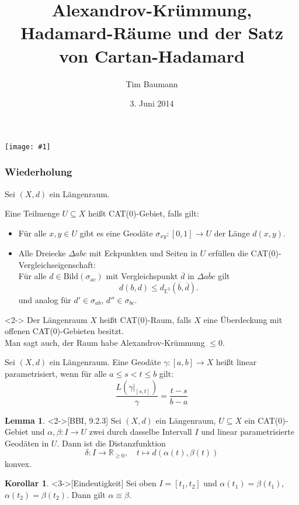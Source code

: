 \documentclass{beamer}
\title{Alexandrov-Krümmung, Hadamard-Räume und der Satz von Cartan-Hadamard}
\author{Tim Baumann}
\institute{Seminar Metrische Geometrie}
\date{3. Juni 2014}
\newcommand{\E}{\mathbb{E}} %
\newcommand{\R}{\mathbb{R}} %
\newcommand{\I}{\left[0,1\right]} %
\newcommand{\Bild}{\mathrm{Bild}} %
\renewcommand{\emph}[1]{\textcolor{Emph}{#1}}
\theoremstyle{definition}
\newtheorem*{lem}{Lemma}
\newtheorem*{kor}{Korollar}
\newcommand{\framedgraphic}[1] {
  \begin{frame}
    \begin{center}
      \vspace{-10pt}
      \texttt{[image: \#1]}
    \end{center}
  \end{frame}
}
\begin{document}
\setlength{\abovedisplayskip}{2pt}
\setlength{\belowdisplayskip}{2pt}
\setlength{\abovedisplayshortskip}{2pt}
\setlength{\belowdisplayshortskip}{2pt}

\begin{frame}[plain]
  \titlepage
\end{frame}

\framedgraphic{bilder/Picture15.jpg}

\begin{frame}
  \frametitle{Wiederholung}

  Sei $(X, d)$ ein Längenraum.

  \begin{definition}
    Eine Teilmenge $U \subseteq X$ heißt \emph{CAT($0$)-Gebiet}, falls gilt:
    \begin{itemize}
      \item Für alle $x, y \in U$ gibt es eine Geodäte $\sigma_{xy} : \I \to U$ der Länge $d(x, y)$.
      \item Alle Dreiecke $\Delta abc$ mit Eckpunkten und Seiten in $U$ erfüllen die CAT($0$)-Vergleichseigenschaft:\\
      Für alle $d \in \Bild(\sigma_{ac})$ mit Vergleichspunkt $\overline{d}$ in $\Delta \overline{abc}$ gilt
      \[ d(b, d) \leq d_{\E^2}(\overline{b}, \overline{d}). \]
      und analog für $d' \in \sigma_{ab}$, $d'' \in \sigma_{bc}$.
    \end{itemize}
  \end{definition}

  \begin{definition}<2->
    Der Längenraum $X$ heißt \emph{CAT($0$)-Raum}, falls $X$ eine Überdeckung mit offenen CAT($0$)-Gebieten besitzt.\\
    Man sagt auch, der Raum habe \emph{Alexandrov-Krümmung $\leq 0$}.
  \end{definition}
\end{frame}

\begin{frame}
  \begin{definition}
    Sei $(X, d)$ ein Längenraum. Eine Geodäte $\gamma : \left[a, b\right] \to X$ heißt \emph{linear parametrisiert}, wenn für alle $a \leq s < t \leq b$ gilt:
    \[ \frac{L(\gamma|_{\left[s,t\right]})}{\gamma} = \frac{t-s}{b-a} \]
  \end{definition}

  \begin{lem}<2->[BBI, 9.2.3]
    Sei $(X, d)$ ein Längenraum, $U \subseteq X$ ein CAT($0$)-Gebiet und $\alpha, \beta : I \to U$ zwei durch dasselbe Intervall $I$ und linear parametrisierte Geodäten in $U$. Dann ist die Distanzfunktion
    \[ \delta : I \to \R_{\geq 0}, \quad t \mapsto d(\alpha(t), \beta(t)) \]
    konvex.
  \end{lem}

  \begin{kor}<3->[Eindeutigkeit]
    Sei oben $I = \left[t_1, t_2\right]$ und $\alpha(t_1) = \beta(t_1)$, $\alpha(t_2) = \beta(t_2)$. Dann gilt $\alpha \equiv \beta$.
  \end{kor}
\end{frame}
\end{document}
